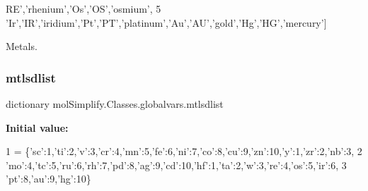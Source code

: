 \begin{DoxyCode}
{      RE'},\textcolor{stringliteral}{'rhenium'},\textcolor{stringliteral}{'Os'},\textcolor{stringliteral}{'OS'},\textcolor{stringliteral}{'osmium'},
5             \textcolor{stringliteral}{'Ir'},\textcolor{stringliteral}{'IR'},\textcolor{stringliteral}{'iridium'},\textcolor{stringliteral}{'Pt'},\textcolor{stringliteral}{'PT'},\textcolor{stringliteral}{'platinum'},\textcolor{stringliteral}{'Au'},\textcolor{stringliteral}{'AU'},\textcolor{stringliteral}{'gold'},\textcolor{stringliteral}{'Hg'},\textcolor{stringliteral}{'HG'},\textcolor{stringliteral}{'mercury'}]
\end{DoxyCode}


Metals. 

\mbox{\label{namespacemolSimplify_1_1Classes_1_1globalvars_a192a3a4c3d1b790d47c670234be91e95}} 
\subsubsection{\texorpdfstring{mtlsdlist}{mtlsdlist}}
{\footnotesize\ttfamily dictionary mol\+Simplify.\+Classes.\+globalvars.\+mtlsdlist}

{\bfseries Initial value\+:}
\begin{DoxyCode}
1 =  \{\textcolor{stringliteral}{'sc'}:1,\textcolor{stringliteral}{'ti'}:2,\textcolor{stringliteral}{'v'}:3,\textcolor{stringliteral}{'cr'}:4,\textcolor{stringliteral}{'mn'}:5,\textcolor{stringliteral}{'fe'}:6,\textcolor{stringliteral}{'ni'}:7,\textcolor{stringliteral}{'co'}:8,\textcolor{stringliteral}{'cu'}:9,\textcolor{stringliteral}{'zn'}:10,\textcolor{stringliteral}{'y'}:1,\textcolor{stringliteral}{'zr'}:2,\textcolor{stringliteral}{'nb'}:3,
2              \textcolor{stringliteral}{'mo'}:4,\textcolor{stringliteral}{'tc'}:5,\textcolor{stringliteral}{'ru'}:6,\textcolor{stringliteral}{'rh'}:7,\textcolor{stringliteral}{'pd'}:8,\textcolor{stringliteral}{'ag'}:9,\textcolor{stringliteral}{'cd'}:10,\textcolor{stringliteral}{'hf'}:1,\textcolor{stringliteral}{'ta'}:2,\textcolor{stringliteral}{'w'}:3,\textcolor{stringliteral}{'re'}:4,\textcolor{stringliteral}{'os'}:5,\textcolor{stringliteral}{'ir'}:6,
3              \textcolor{stringliteral}{'pt'}:8,\textcolor{stringliteral}{'au'}:9,\textcolor{stringliteral}{'hg'}:10\}
\end{DoxyCode}


